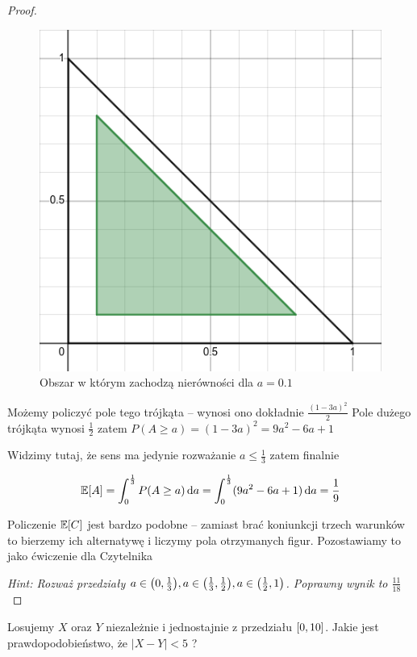 \begin{proof}
	\begin{figure}[H]
		\centering
		\includegraphics[scale=0.5]{img/continuous probability/breaking-stick-minimum-area.png}
		\caption{Obszar w którym zachodzą nierówności dla \(a = 0.1\)}
	\end{figure}

	Możemy policzyć pole tego trójkąta -- wynosi ono dokładnie \( \frac{(1 - 3a)^2}{2} \)
	Pole dużego trójkąta wynosi \(\frac{1}{2}\) zatem \( P(A \geq a) = (1 - 3a)^2 = 9a^2 - 6a + 1 \)

	Widzimy tutaj, że sens ma jedynie rozważanie \(a \leq \frac{1}{3} \) zatem finalnie

	\[
		\expected{A} = \int_0^{\frac{1}{3}} P(A \geq a) \diff a
		= \int_0^{\frac{1}{3}} (9a^2 - 6a + 1) \diff a = \frac{1}{9}
	\]

	Policzenie \(\expected{C}\) jest bardzo podobne -- zamiast brać koniunkcji trzech warunków
	to bierzemy ich alternatywę i liczymy pola otrzymanych figur. Pozostawiamy to jako ćwiczenie dla Czytelnika

	\textit{Hint: Rozważ przedziały \( a \in \pars{0, \frac{1}{3}}, a \in \pars{\frac{1}{3}, \frac{1}{2}}, a \in \pars{\frac{1}{2}, 1} \). Poprawny wynik to \(\frac{11}{18}\)}
\end{proof}
\newpage
\begin{exercise}
	Losujemy \( X \) oraz \( Y \) niezależnie i jednostajnie z przedziału \( \left[0, 10\right] \).
	Jakie jest prawdopodobieństwo, że \( |X - Y| < 5 \) ?
\end{exercise}

